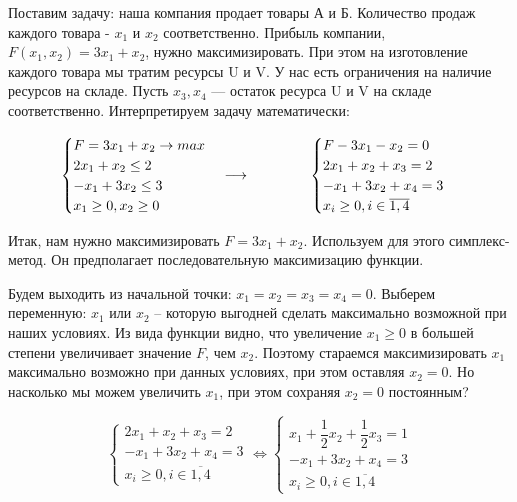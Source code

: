 Поставим задачу: наша компания продает товары А и Б. Количество продаж каждого товара - $x_1$ и $x_2$ соответственно.
Прибыль компании, $F(x_1, x_2) = 3x_1 + x_2$, нужно максимизировать. При этом на изготовление каждого товара мы тратим ресурсы U и V.
У нас есть ограничения на наличие ресурсов на складе. Пусть $x_3, x_4$ --- остаток ресурса U и V на складе соответственно.
Интерпретируем задачу математически:

\begin{align*}
    \begin{cases}
        F = 3x_1 + x_2\to max \\
        2x_1 + x_2 \leq 2     \\
        -x_1 + 3 x_2 \leq 3   \\
        x_1 \geq 0, x_2 \geq 0
    \end{cases} \longrightarrow
    \hspace{1.5cm}
    \begin{cases}
        F - 3x_1 - x_2 = 0    \\
        2x_1 + x_2 + x_3 = 2  \\
        -x_1 + 3x_2 + x_4 = 3 \\
        x_{i} \geq 0, i\in\overline{1,4}
    \end{cases}
\end{align*}

Итак, нам нужно максимизировать $F = 3x_1 + x_2$. Используем для этого симплекс-метод. Он предполагает последовательную максимизацию
функции.

Будем выходить из начальной точки: $x_1 = x_2 = x_3 = x_4 = 0$.
Выберем переменную: $x_1$ или $x_2$ -- которую выгодней сделать максимально возможной при наших условиях.
Из вида функции видно, что увеличение $x_1 \geq 0$ в большей степени увеличивает значение $F$, чем $x_2$.
Поэтому стараемся максимизировать $x_1$ максимально возможно при данных условиях, при этом оставляя $x_2 = 0$.
Но насколько мы можем увеличить $x_1$, при этом сохраняя $x_2 = 0$ постоянным?

\[
    \begin{cases}
        2x_1 + x_2 + x_3 = 2  \\
        -x_1 + 3x_2 + x_4 = 3 \\
        x_{i} \geq 0, i\in\overline{1,4}
    \end{cases}
    \Leftrightarrow
    \begin{cases}
        x_1 + \dfrac{1}{2}x_2 + \dfrac{1}{2}x_3 = 1 \\
        -x_1 + 3x_2 + x_4 = 3                       \\
        x_{i} \geq 0, i\in\overline{1,4}
    \end{cases}
\]


